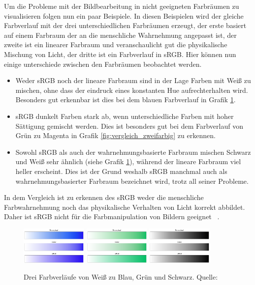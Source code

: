 \documentclass[12pt, a4paper, ngerman]{article}
\begin{document}
Um die Probleme mit der Bildbearbeitung in nicht geeigneten Farbräumen zu visualisieren folgen nun ein paar Beispiele. 
In diesen Beispielen wird der gleiche Farbverlauf mit der drei unterschiedlichen Farbräumen erzeugt, 
der erste basiert auf einem Farbraum der an die menschliche Wahrnehmung angepasst ist, 
der zweite ist ein linearer Farbraum und veranschaulicht gut die physikalische Mischung von Licht, 
der dritte ist ein Farbverlauf in sRGB.
Hier können nun einige unterschiede zwischen den Farbräumen beobachtet werden.
\begin{itemize}
  \item Weder sRGB noch der lineare Farbraum sind in der Lage Farben mit Weiß zu mischen, ohne dass der eindruck eines konstanten Hue aufrechterhalten wird. Besonders gut erkennbar ist dies bei dem blauen Farbverlauf in Grafik \ref{fig:vergleich_white}.
  \item sRGB dunkelt Farben stark ab, wenn unterschiedliche Farben mit hoher Sättigung gemischt werden. Dies ist besonders gut bei dem Farbverlauf von Grün zu Magenta in Grafik \ref{fig:vergleich_zweifarbig} zu erkennen.
  \item Sowohl sRGB als auch der wahrnehmungsbasierte Farbraum mischen Schwarz und Weiß sehr ähnlich (siehe Grafik \ref{fig:vergleich_white}), während der lineare Farbraum viel heller erscheint. Dies ist der Grund weshalb sRGB manchmal auch als wahrnehmungsbasierter Farbraum bezeichnet wird, trotz all seiner Probleme.
\end{itemize}
In dem Vergleich ist zu erkennen des sRGB weder die menschliche Farbwahrnehmung 
noch das physikalische Verhalten von Licht korrekt abbildet.
Daher ist sRGB nicht für die Farbmanipulation von Bildern geeignet ~\cite{Ottosson_2020}.

\begin{figure}
  \centering
  \includegraphics[width=0.29\textwidth]{Grafiken/Farbverlauf/whiteblue.png}
  \includegraphics[width=0.29\textwidth]{Grafiken/Farbverlauf/whitegreen.png}
  \includegraphics[width=0.29\textwidth]{Grafiken/Farbverlauf/whiteblack.png}
  \caption{Drei Farbverläufe von Weiß zu Blau, Grün und Schwarz. Quelle: ~\cite{Ottosson_2020}}
  \label{fig:vergleich_white}
\end{figure}
\end{document}
